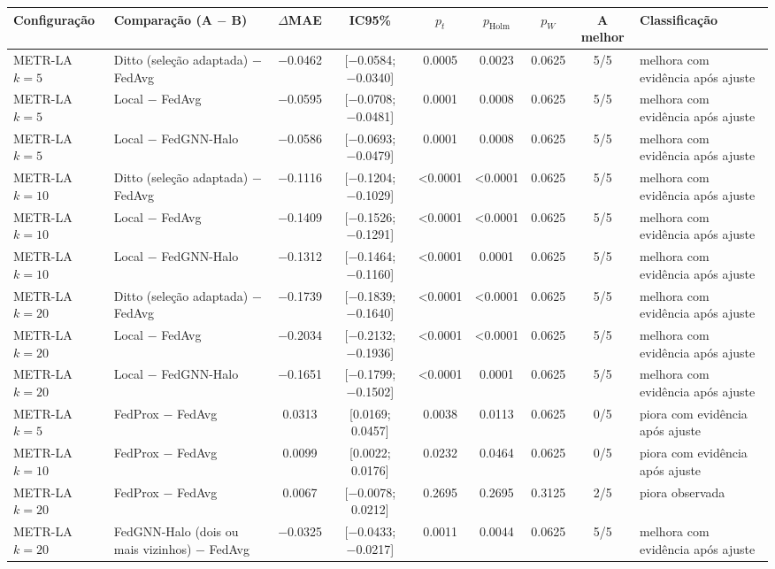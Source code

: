 
\begin{tabular}{>{\raggedright\arraybackslash}l>{\raggedright\arraybackslash}p{3.3cm}cccccc>{\raggedright\arraybackslash}p{3.3cm}}
\toprule
Configuração & Comparação (A $-$ B) & $\Delta$MAE & IC95\% & $p_t$ & $p_{\mathrm{Holm}}$ & $p_W$ & A melhor & Classificação \\
\midrule
METR-LA $k=5$ & Ditto (seleção adaptada) − FedAvg & \num{-0.0462} & [\num{-0.0584}; \num{-0.0340}] & \num{0.0005} & \num{0.0023} & \num{0.0625} & 5/5 & melhora com evidência após ajuste \\
METR-LA $k=5$ & Local − FedAvg & \num{-0.0595} & [\num{-0.0708}; \num{-0.0481}] & \num{0.0001} & \num{0.0008} & \num{0.0625} & 5/5 & melhora com evidência após ajuste \\
METR-LA $k=5$ & Local − FedGNN-Halo & \num{-0.0586} & [\num{-0.0693}; \num{-0.0479}] & \num{0.0001} & \num{0.0008} & \num{0.0625} & 5/5 & melhora com evidência após ajuste \\
METR-LA $k=10$ & Ditto (seleção adaptada) − FedAvg & \num{-0.1116} & [\num{-0.1204}; \num{-0.1029}] & \num{<0.0001} & \num{<0.0001} & \num{0.0625} & 5/5 & melhora com evidência após ajuste \\
METR-LA $k=10$ & Local − FedAvg & \num{-0.1409} & [\num{-0.1526}; \num{-0.1291}] & \num{<0.0001} & \num{<0.0001} & \num{0.0625} & 5/5 & melhora com evidência após ajuste \\
METR-LA $k=10$ & Local − FedGNN-Halo & \num{-0.1312} & [\num{-0.1464}; \num{-0.1160}] & \num{<0.0001} & \num{0.0001} & \num{0.0625} & 5/5 & melhora com evidência após ajuste \\
METR-LA $k=20$ & Ditto (seleção adaptada) − FedAvg & \num{-0.1739} & [\num{-0.1839}; \num{-0.1640}] & \num{<0.0001} & \num{<0.0001} & \num{0.0625} & 5/5 & melhora com evidência após ajuste \\
METR-LA $k=20$ & Local − FedAvg & \num{-0.2034} & [\num{-0.2132}; \num{-0.1936}] & \num{<0.0001} & \num{<0.0001} & \num{0.0625} & 5/5 & melhora com evidência após ajuste \\
METR-LA $k=20$ & Local − FedGNN-Halo & \num{-0.1651} & [\num{-0.1799}; \num{-0.1502}] & \num{<0.0001} & \num{0.0001} & \num{0.0625} & 5/5 & melhora com evidência após ajuste \\
METR-LA $k=5$ & FedProx − FedAvg & \num{+0.0313} & [\num{+0.0169}; \num{+0.0457}] & \num{0.0038} & \num{0.0113} & \num{0.0625} & 0/5 & piora com evidência após ajuste \\
METR-LA $k=10$ & FedProx − FedAvg & \num{+0.0099} & [\num{+0.0022}; \num{+0.0176}] & \num{0.0232} & \num{0.0464} & \num{0.0625} & 0/5 & piora com evidência após ajuste \\
METR-LA $k=20$ & FedProx − FedAvg & \num{+0.0067} & [\num{-0.0078}; \num{+0.0212}] & \num{0.2695} & \num{0.2695} & \num{0.3125} & 2/5 & piora observada \\
METR-LA $k=20$ & FedGNN-Halo (dois ou mais vizinhos) − FedAvg & \num{-0.0325} & [\num{-0.0433}; \num{-0.0217}] & \num{0.0011} & \num{0.0044} & \num{0.0625} & 5/5 & melhora com evidência após ajuste \\
\bottomrule
\end{tabular}
